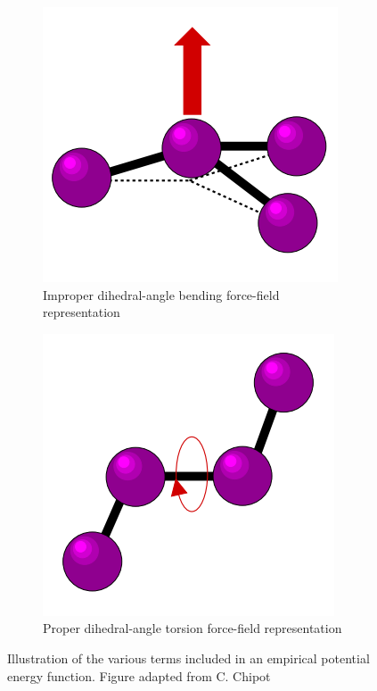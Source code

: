 \begin{figure}[ht]
    \begin{subfigure}[t]{0.25\textwidth}
    \includegraphics[width=\textwidth]{Figures/Chapter2/impropial.png}
    \caption{Improper dihedral-angle bending force-field representation}
    \label{fig:impropial}
    \end{subfigure}
    \hspace{1cm}
    \begin{subfigure}[t]{0.25\textwidth}
    \includegraphics[width=\textwidth]{Figures/Chapter2/torsional.png}
    \caption{Proper dihedral-angle torsion force-field representation }
    \label{fig:torsional}
    \end{subfigure}
    
    
    \caption{Illustration of the various terms included in an empirical potential energy function. Figure adapted from C. Chipot \cite{chipot2010numerical}}
    \label{fig:bonded_inter}
    
\end{figure}

